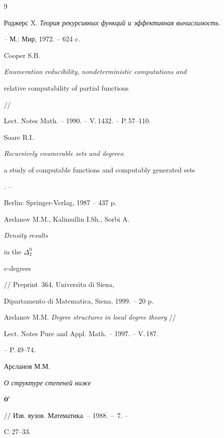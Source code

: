 \begin{thebibliography}{9}







Роджерс X. {\it Теория рекурсивных функций и эффективная вычислимость}.


-- М.: Мир, 1972. -- 624 c.




Cooper S.B. {\em Enumeration reducibility, nondeterministic computations and


relative computability of partial functions} //


Lect. Notes Math. -- 1990. -- V.\,1432. -- P.\,57--110.




Soare R.I. {\it Recursively enumerable sets and degrees$:$


a study of computable functions and computably generated sets}. --


Berlin: Springer-Verlag, 1987 -- 437 p. 




Arslanov M.M., Kalimullin I.Sh., Sorbi A. {\em Density results


in the $\Delta_2^0$


$e$-degrees} // Preprint \No\,364, Universita di Siena,


Dipartamento di Matematica, Siena, 1999. -- 20 p. 




Arslanov M.M. {\em Degree structures in local degree theory} //


Lect. Notes Pure and Appl. Math. -- 1997. -- V.\,187.


-- P.\,49--74.




Арсланов М.М. {\em О структуре степеней ниже


${\bold 0}'$} // Изв. вузов. Математика. -- 1988. -- \No\,7. --


C.\,27--33.





\end{thebibliography}





\vskip 2cm












\label{end}






